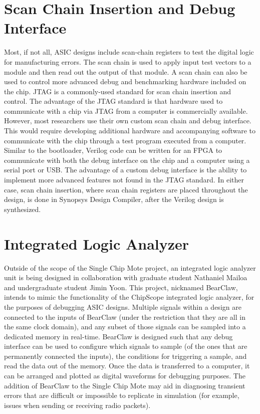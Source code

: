 \section{Scan Chain Insertion and Debug Interface}
Most, if not all, ASIC designs include scan-chain registers to test the digital logic for manufacturing errors. The scan chain is used to apply input test vectors to a module and then read out the output of that module. A scan chain can also be used to control more advanced debug and benchmarking hardware included on the chip. JTAG is a commonly-used standard for scan chain insertion and control. The advantage of the JTAG standard is that hardware used to communicate with a chip via JTAG from a computer is commercially available. However, most researchers use their own custom scan chain and debug interface. This would require developing additional hardware and accompanying software to communicate with the chip through a test program executed from a computer. Similar to the bootloader, Verilog code can be written for an FPGA to communicate with both the debug interface on the chip and a computer using a serial port or USB. The advantage of a custom debug interface is the ability to implement more advanced features not found in the JTAG standard. In either case, scan chain insertion, where scan chain registers are placed throughout the design, is done in Synopsys Design Compiler, after the Verilog design is synthesized.

\section{Integrated Logic Analyzer}
Outside of the scope of the Single Chip Mote project, an integrated logic analyzer unit is being designed in collaboration with graduate student Nathaniel Mailoa and undergraduate student Jimin Yoon. This project, nicknamed BearClaw, intends to mimic the functionality of the ChipScope integrated logic analyzer, for the purposes of debugging ASIC designs. Multiple signals within a design are connected to the inputs of BearClaw (under the restriction that they are all in the same clock domain), and any subset of those signals can be sampled into a dedicated memory in real-time. BearClaw is designed such that any debug interface can be used to configure which signals to sample (of the ones that are permanently connected the inputs), the conditions for triggering a sample, and read the data out of the memory. Once the data is transferred to a computer, it can be arranged and plotted as digital waveforms for debugging purposes. The addition of BearClaw to the Single Chip Mote may aid in diagnosing transient errors that are difficult or impossible to replicate in simulation (for example, issues when sending or receiving radio packets).

